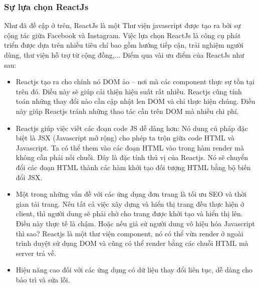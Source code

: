 \subsubsection{Sự lựa chọn ReactJs}
Như đã đề cập ở trên, ReactJs là một Thư viện javascript được tạo ra bởi sự cộng tác giữa Facebook và Instagram. Việc lựa chọn ReactJs là công cụ phát triển được dựa trên nhiều tiêu chí bao gồm hướng tiếp cận, trải nghiệm người dùng, thư viện hỗ trợ từ cộng đồng,... Điểm qua vài ưu điểm của ReactJs như sau:
\begin{itemize}
    \item Reactjs tạo ra cho chính nó DOM ảo – nơi mà các component thực sự tồn tại trên đó. Điều này sẽ giúp cải thiện hiệu suất rất nhiều. Reactjs cũng tính toán những thay đổi nào cần cập nhật len DOM và chỉ thực hiện chúng. Điều này giúp Reactjs tránh những thao tác cần trên DOM mà nhiều chi phí.
    \item Reactjs giúp việc viết các đoạn code JS dễ dàng hơn: Nó dung cú pháp đặc biệt là JSX (Javascript mở rộng) cho phép ta trộn giữa code HTML và Javascript. Ta có thể them vào các đoạn HTML vào trong hàm render mà không cần phải nối chuỗi. Đây là đặc tính thú vị của Reactjs. Nó sẽ chuyển đổi các đoạn HTML thành các hàm khởi tạo đối tượng HTML bằng bộ biến đổi JSX.
    \item Một trong những vấn đề với các ứng dụng đơn trang là tối ưu SEO và thời gian tải trang. Nếu tất cả việc xây dựng và hiển thị trang đều thực hiện ở client, thì người dung sẽ phải chờ cho trang được khởi tạo và hiển thị lên. Điều này thực tế là chậm. Hoặc nếu giả sử người dung vô hiệu hóa Javascript thì sao? Reactjs là một thư viện component, nó có thể vừa render ở ngoài trình duyệt sử dụng DOM và cũng có thể render bằng các chuỗi HTML mà server trả về. 
    \item Hiệu năng cao đối với các ứng dụng có dữ liệu thay đổi liên tục, dễ dàng cho bảo trì và sửa lỗi.
\end{itemize}

